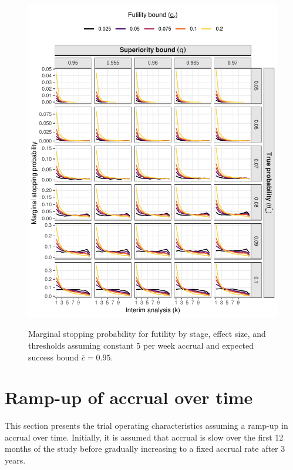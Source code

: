 \documentclass{article}
\begin{document}
\begin{figure}[!ht]
	\caption{Marginal stopping probability for futility by stage, effect size, and thresholds assuming constant 5 per week accrual and expected success bound $\overline{c}=0.95$.}
	\includegraphics{stop_futility_5.pdf}
	\label{fig:stop_futility_5}
\end{figure}

\clearpage

\section{Ramp-up of accrual over time}

This section presents the trial operating characteristics assuming a ramp-up in accrual over time.
Initially, it is assumed that accrual is slow over the first 12 months of the study before gradually increasing to a fixed accrual rate after 3 years.
\end{document}
